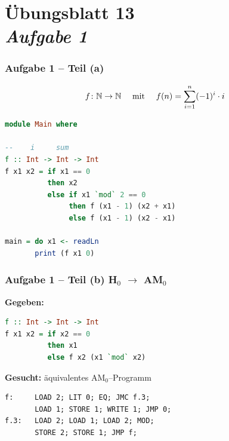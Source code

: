 \documentclass{beamer}
\begin{document}
\section{Übungsblatt 13 \\ \textit{Aufgabe 1}}

\begin{frame}[t, fragile] \frametitle{Aufgabe 1 -- Teil (a)}
	\begin{equation*}
		f \colon \mathbb{N} \to \mathbb{N} \quad \text{ mit } \quad f(n) = \sum_{i=1}^{n} (-1)^i \cdot i
	\end{equation*}
	\pause	
	\begin{lstlisting}[language=Haskell]
module Main where

--    i     sum
f :: Int -> Int -> Int
f x1 x2 = if x1 == 0 
          then x2
          else if x1 `mod` 2 == 0
               then f (x1 - 1) (x2 + x1)
               else f (x1 - 1) (x2 - x1)

main = do x1 <- readLn
       print (f x1 0)
	\end{lstlisting}
\end{frame}

\begin{frame}[t, fragile] \frametitle{Aufgabe 1 -- Teil (b) \hfill H${}_\text{0}$ $\to$ AM${}_\text{0}$}
	
	\textbf{Gegeben:}
	\begin{lstlisting}[language=Haskell]
f :: Int -> Int -> Int
f x1 x2 = if x2 == 0
          then x1
          else f x2 (x1 `mod` x2)

	\end{lstlisting}
	
	\textbf{Gesucht:} äquivalentes AM${}_\text{0}$--Programm
	\pause
	\begin{lstlisting}[style=am0, numbers=none]
f:     LOAD 2; LIT 0; EQ; JMC f.3;
       LOAD 1; STORE 1; WRITE 1; JMP 0;
f.3:   LOAD 2; LOAD 1; LOAD 2; MOD;
       STORE 2; STORE 1; JMP f;
	\end{lstlisting}
\end{frame}
\end{document}
